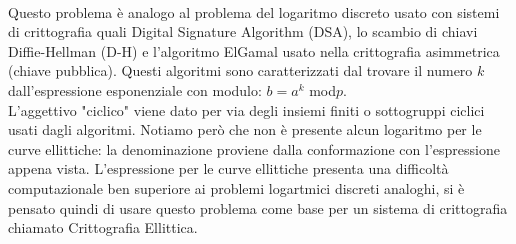 \documentclass[a4paper,12pt]{tesiinfo}
\begin{document}
\\
Questo problema \`e analogo al problema del logaritmo discreto usato con sistemi di crittografia quali Digital Signature Algorithm (DSA), lo scambio di chiavi Diffie-Hellman (D-H) e l'algoritmo ElGamal usato nella crittografia asimmetrica (chiave pubblica). Questi algoritmi sono caratterizzati dal trovare il numero $k$ dall'espressione esponenziale con modulo: $b = a^k$ mod$p$. 
\\
L'aggettivo "ciclico" viene dato per via degli insiemi finiti o sottogruppi ciclici usati dagli algoritmi. Notiamo per\`o che non \`e presente alcun logaritmo per le curve ellittiche: la denominazione proviene dalla conformazione con l'espressione appena vista. L'espressione per le curve ellittiche presenta una difficolt\`a computazionale ben superiore ai problemi logartmici discreti analoghi, si \`e pensato quindi di usare questo problema come base per un sistema di crittografia chiamato Crittografia Ellittica.
%
%
%
%
%
\end{document}
